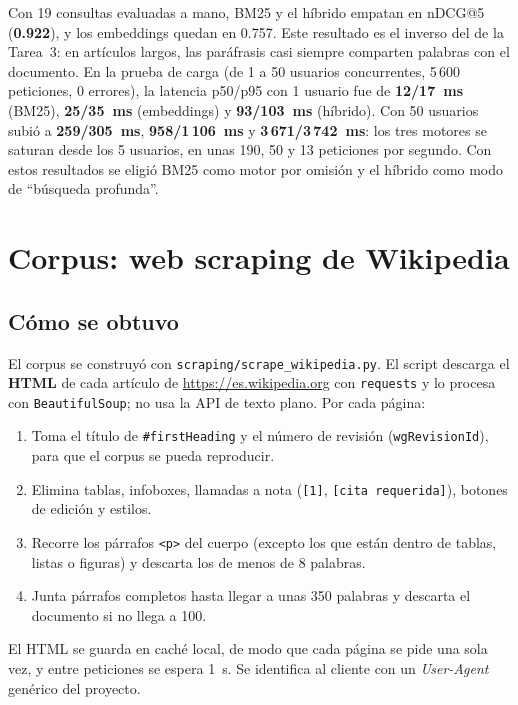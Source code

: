 \documentclass[11pt,letterpaper]{article}
\newcommand{\term}[1]{\texttt{#1}}
\begin{document}
Con 19 consultas evaluadas a mano, BM25 y el híbrido empatan en nDCG@5 (\textbf{0.922}), y los embeddings quedan en 0.757. Este resultado es el inverso del de la Tarea~3: en artículos largos, las paráfrasis casi siempre comparten palabras con el documento. En la prueba de carga (de 1 a 50 usuarios concurrentes, 5\,600 peticiones, 0 errores), la latencia p50/p95 con 1 usuario fue de \textbf{12/17~ms} (BM25), \textbf{25/35~ms} (embeddings) y \textbf{93/103~ms} (híbrido). Con 50 usuarios subió a \textbf{259/305~ms}, \textbf{958/1\,106~ms} y \textbf{3\,671/3\,742~ms}: los tres motores se saturan desde los 5 usuarios, en unas 190, 50 y 13 peticiones por segundo. Con estos resultados se eligió BM25 como motor por omisión y el híbrido como modo de ``búsqueda profunda''.

\newpage
\tableofcontents
\newpage

\section{Corpus: web scraping de Wikipedia}

\subsection{Cómo se obtuvo}

El corpus se construyó con \term{scraping/scrape\_wikipedia.py}. El script descarga el \textbf{HTML} de cada artículo de \url{https://es.wikipedia.org} con \term{requests} y lo procesa con \term{BeautifulSoup}; no usa la API de texto plano. Por cada página:
\begin{enumerate}[nosep]
\item Toma el título de \term{\#firstHeading} y el número de revisión (\term{wgRevisionId}), para que el corpus se pueda reproducir.
\item Elimina tablas, infoboxes, llamadas a nota (\term{[1]}, \term{[cita requerida]}), botones de edición y estilos.
\item Recorre los párrafos \term{<p>} del cuerpo (excepto los que están dentro de tablas, listas o figuras) y descarta los de menos de 8 palabras.
\item Junta párrafos completos hasta llegar a unas 350 palabras y descarta el documento si no llega a 100.
\end{enumerate}
El HTML se guarda en caché local, de modo que cada página se pide una sola vez, y entre peticiones se espera 1~s. Se identifica al cliente con un \emph{User-Agent} genérico del proyecto.
\end{document}
